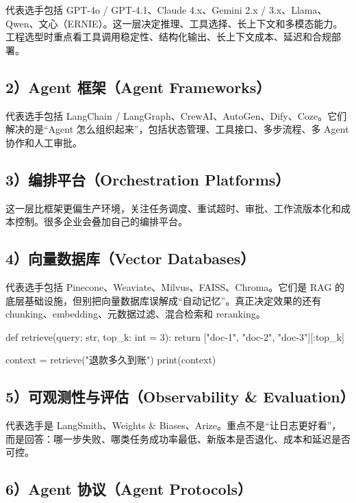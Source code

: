 代表选手包括 GPT-4o / GPT-4.1、Claude 4.x、Gemini 2.x / 3.x、Llama、Qwen、文心（ERNIE）。这一层决定推理、工具选择、长上下文和多模态能力。工程选型时重点看工具调用稳定性、结构化输出、长上下文成本、延迟和合规部署。


\subsection{2）Agent 框架（Agent Frameworks）}

代表选手包括 LangChain / LangGraph、CrewAI、AutoGen、Dify、Coze。它们解决的是``Agent 怎么组织起来''，包括状态管理、工具接口、多步流程、多 Agent 协作和人工审批。


\subsection{3）编排平台（Orchestration Platforms）}

这一层比框架更偏生产环境，关注任务调度、重试超时、审批、工作流版本化和成本控制。很多企业会叠加自己的编排平台。


\subsection{4）向量数据库（Vector Databases）}

代表选手包括 Pinecone、Weaviate、Milvus、FAISS、Chroma。它们是 RAG 的底层基础设施，但别把向量数据库误解成``自动记忆''。真正决定效果的还有 chunking、embedding、元数据过滤、混合检索和 reranking。


\begin{codeblock}
def retrieve(query: str, top_k: int = 3):
    return ["doc-1", "doc-2", "doc-3"][:top_k]


context = retrieve("退款多久到账")
print(context)
\end{codeblock}

\subsection{5）可观测性与评估（Observability \& Evaluation）}

代表选手是 LangSmith、Weights \& Biases、Arize。重点不是``让日志更好看''，而是回答：哪一步失败、哪类任务成功率最低、新版本是否退化、成本和延迟是否可控。


\subsection{6）Agent 协议（Agent Protocols）}

